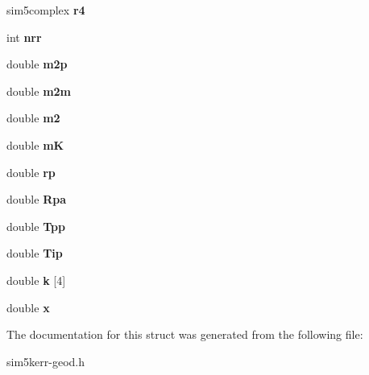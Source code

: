 \begin{DoxyCompactItemize}
sim5complex {\bfseries r4}
\item 
\mbox{\label{structgeodesic_a6b22e8744ef241dd14796faea185e15d}} 
int {\bfseries nrr}
\item 
\mbox{\label{structgeodesic_a8afae11cb61614e93b8f73b895cb166d}} 
double {\bfseries m2p}
\item 
\mbox{\label{structgeodesic_a385b2780a430de8e977992e24b88b3ad}} 
double {\bfseries m2m}
\item 
\mbox{\label{structgeodesic_a84c8015e09f9cf18a977a937c99233fb}} 
double {\bfseries m2}
\item 
\mbox{\label{structgeodesic_a4c367956282e9cf820fd029b9a24965b}} 
double {\bfseries mK}
\item 
\mbox{\label{structgeodesic_a0be4c759078bb6d4fff3a5939b9f71b4}} 
double {\bfseries rp}
\item 
\mbox{\label{structgeodesic_afd6a4074ec478d25e4d2bed6a64037cc}} 
double {\bfseries Rpa}
\item 
\mbox{\label{structgeodesic_a31202e9d8bb0879244bfbb1988b13977}} 
double {\bfseries Tpp}
\item 
\mbox{\label{structgeodesic_a41b11282c141ef53361bd1dd3b194572}} 
double {\bfseries Tip}
\item 
\mbox{\label{structgeodesic_a9ccb6401dcd5245b04b7b37ca5a08f56}} 
double {\bfseries k} \mbox{[}4\mbox{]}
\item 
\mbox{\label{structgeodesic_aec44d2225c6ba126689bbc9b83b9ac95}} 
double {\bfseries x}
\end{DoxyCompactItemize}


The documentation for this struct was generated from the following file\+:\begin{DoxyCompactItemize}
\item 
sim5kerr-\/geod.\+h\end{DoxyCompactItemize}
